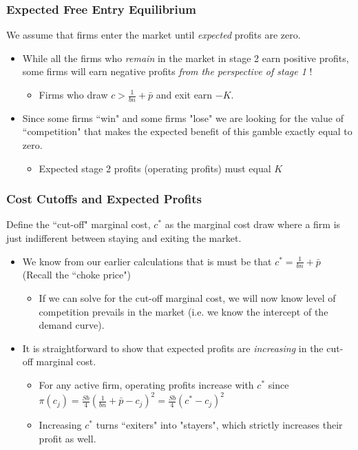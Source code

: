 \documentclass{beamer}
\begin{document}
\begin{frame}
	\frametitle{Expected Free Entry Equilibrium}
We assume that firms enter the market until \emph{expected} profits are zero.
	\begin{itemize}
		\item While all the firms who \emph{remain} in the market in stage 2 earn positive profits, some firms will earn negative profits \emph{from the perspective of stage 1} !
			\begin{itemize}
				\item Firms who draw $c>\frac{1}{bn}+\bar{p}$ and exit earn $-K$.
			\end{itemize}
		\item Since some firms ``win" and some firms "lose" we are looking for the value of ``competition" that makes the expected benefit of this gamble exactly equal to zero.
			\begin{itemize}
				\item Expected stage 2 profits (operating profits) must equal $K$
			\end{itemize}
		\end{itemize}
\end{frame}

\begin{frame}[label=cost]
	\frametitle{Cost Cutoffs and Expected Profits}
Define the ``cut-off" marginal cost, $c^*$ as the marginal cost draw where a firm is just indifferent between staying and exiting the market. 
\begin{itemize} 
	\item We know from our earlier calculations that is must be that  $c^*=\frac{1}{bn}+\bar{p}$ (Recall the ``choke price")
		\begin{itemize}
			\item If we can solve for the cut-off marginal cost, we will now know level of competition prevails in the market (i.e. we know the intercept of the demand curve).
		\end{itemize}
	\item It is straightforward to show that expected profits are \emph{increasing} in the cut-off marginal cost. \hyperlink{Formal}{}
		\begin{itemize}
			\item For any active firm, operating profits increase with $c^*$ since $\pi(c_j)=\frac{Sb}{4}\left(\frac{1}{bn}+\bar{p} -c_j \right)^2 =  \frac{Sb}{4}\left(c^*-c_j \right)^2 $
			\item Increasing $c^*$ turns ``exiters" into "stayers", which strictly increases their profit as well.
		\end{itemize}


\end{itemize}

\end{frame}
\end{document}
